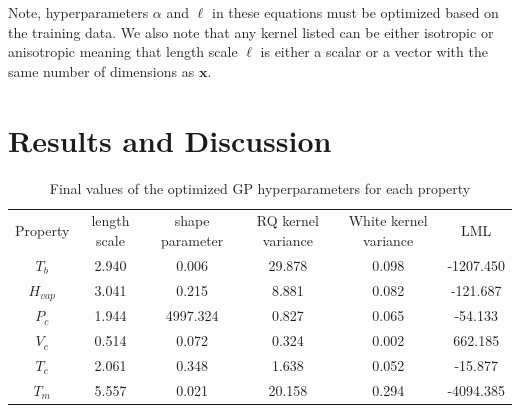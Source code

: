 \documentclass[journal=jacsat,manuscript=article]{achemso}
\begin{document}



Note, hyperparameters $\alpha$ and $\ell$ in these equations must be optimized based on the training data. We also note that any kernel listed can be either isotropic or anisotropic meaning that length scale $\ell$ is either a scalar or a vector with the same number of dimensions as $\mathbf{x}$.



\section{Results and Discussion}







\begin{table}[H]
    \centering
    \begin{tabular}{cccccc}
         Property&  length scale&  shape parameter&  RQ kernel variance&  White kernel variance&  LML
\\
         $T_b$&  2.940&  0.006&  29.878&  0.098&  -1207.450
\\
         $H_{vap}$&  3.041&  0.215&  8.881&  0.082&  -121.687
\\
         $P_c$&  1.944&  4997.324&  0.827&  0.065&  -54.133
\\
         $V_c$&  0.514&  0.072&  0.324&  0.002&  662.185
\\
         $T_c$&  2.061&  0.348&  1.638&  0.052&  -15.877
\\
         $T_m$&  5.557&  0.021&  20.158&  0.294&  -4094.385
\\
    \end{tabular}
    \caption{Final values of the optimized GP hyperparameters for each property}
    \label{tab:final_hyperparameters}
\end{table}
\end{document}
